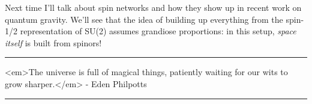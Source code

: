 Next time I'll talk about spin networks and how they show up in recent
work on quantum gravity.  We'll see that the idea of building up everything
from the spin-1/2 representation of SU(2) assumes grandiose proportions:
in this setup, \emph{space itself} is built from spinors!







\par\noindent\rule{\textwidth}{0.4pt}
<em>The universe is full of
magical things, patiently waiting for our wits to grow sharper.</em> - Eden Philpotts 
\par\noindent\rule{\textwidth}{0.4pt}

